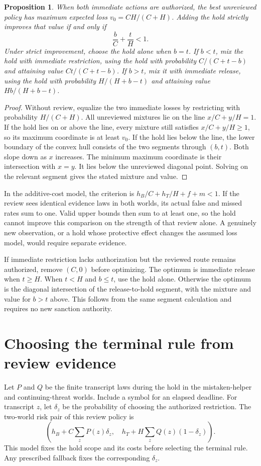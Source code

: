 \documentclass[11pt]{article}
\newtheorem{proposition}{Proposition}
\begin{document}
\begin{proposition}
When both immediate actions are authorized, the best
unreviewed policy has maximum expected loss $v_0=CH/(C+H)$.
Adding the hold strictly improves that value if and only if
\[
 \frac bC+\frac tH<1.
\]
Under strict improvement, choose the hold alone when $b=t$.
If $b<t$, mix the hold with immediate restriction, using
the hold with probability $C/(C+t-b)$ and attaining value
$Ct/(C+t-b)$. If $b>t$, mix it with immediate release,
using the hold with probability $H/(H+b-t)$ and attaining
value $Hb/(H+b-t)$.
\end{proposition}
\begin{proof}
Without review, equalize the two immediate losses by
restricting with probability $H/(C+H)$. All unreviewed
mixtures lie on the line $x/C+y/H=1$. If the hold lies on
or above the line, every mixture still satisfies
$x/C+y/H\ge1$, so its maximum coordinate is at least $v_0$.
If the hold lies below the line, the lower boundary of the
convex hull consists of the two segments through $(b,t)$.
Both slope down as $x$ increases. The minimum maximum
coordinate is their intersection with $x=y$. It lies below
the unreviewed diagonal point. Solving on the relevant
segment gives the stated mixture and value.
\end{proof}

In the additive-cost model, the criterion is
$h_B/C+h_T/H+f+m<1$. If the review sees identical evidence
laws in both worlds, its actual false and missed rates sum
to one. Valid upper bounds then sum to at least one, so the
hold cannot improve this comparison on the strength of
that review alone. A genuinely new observation, or a hold
whose protective effect changes the assumed loss model,
would require separate evidence.

If immediate restriction lacks authorization but the reviewed
route remains authorized, remove $(C,0)$ before optimizing.
The optimum is immediate release when $t\ge H$. When $t<H$
and $b\le t$, use the hold alone. Otherwise the optimum is
the diagonal intersection of the release-to-hold segment,
with the mixture and value for $b>t$ above. This follows
from the same segment calculation and requires no new sanction
authority.

\section{Choosing the terminal rule from review evidence}
Let $P$ and $Q$ be the finite transcript laws during the hold
in the mistaken-helper and continuing-threat worlds. Include a
symbol for an elapsed deadline. For transcript $z$, let $\delta_z$
be the probability of choosing the authorized restriction. The
two-world risk pair of this review policy is
\[
\left(h_B+C\sum_z P(z)\delta_z,\quad
      h_T+H\sum_z Q(z)(1-\delta_z)\right).
\]
This model fixes the hold scope and its costs before selecting
the terminal rule. Any prescribed fallback fixes the corresponding
$\delta_z$.
\end{document}
